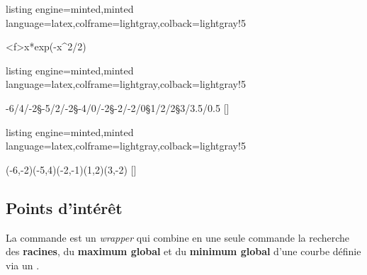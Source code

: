 \documentclass[11pt,a4paper]{ltxdoc}
\begin{document}
\begin{tcblisting}{listing engine=minted,minted language=latex,colframe=lightgray,colback=lightgray!5}
\begin{GraphiqueTikz}[Ymin=-1,Ymax=1.5]
  \TracerAxesGrilles{}{}
  \DefinirCourbe[Trace,Couleur=blue]<f>{x*exp(-x^2/2)}
\end{GraphiqueTikz}
\end{tcblisting}

\begin{tcblisting}{listing engine=minted,minted language=latex,colframe=lightgray,colback=lightgray!5}
\begin{GraphiqueTikz}[x=0.8cm,y=1cm,Xmin=-7,Xmax=4,Ymin=-3,Ymax=5]
  \TracerAxesGrilles[Grads=false,Elargir=2.5mm]{}{}
  \DefinirListeSpline%
    {-6/4/-2§-5/2/-2§-4/0/-2§-2/-2/0§1/2/2§3/3.5/0.5}%
    [\lstsplineA]
  \DefinirCourbeSpline%
    [Nom=splinetest,Trace,Couleur=teal]%
    {\lstsplineA}
\end{GraphiqueTikz}
\end{tcblisting}

\begin{tcblisting}{listing engine=minted,minted language=latex,colframe=lightgray,colback=lightgray!5}
\begin{GraphiqueTikz}[x=0.8cm,y=1cm,Xmin=-7,Xmax=4,Ymin=-3,Ymax=5]
  \TracerAxesGrilles[Grads=false,Elargir=2.5mm]{}{}
  \DefinirListeInterpo%
    {(-6,-2)(-5,4)(-2,-1)(1,2)(3,-2)}%
    [\interpoA]
  \DefinirCourbeInterpo%
    [Nom=interpotest,Couleur=blue,Trace]{\interpoA}
\end{GraphiqueTikz}
\end{tcblisting}

\pagebreak

\subsection{Points d'intérêt}\label{pointsinteret}

La commande  est un \textit{wrapper} qui combine en une seule commande la recherche des \textbf{racines}, du \textbf{maximum global} et du \textbf{minimum global} d'une courbe définie via un .
\end{document}
